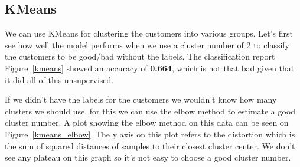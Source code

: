 \documentclass[runningheads]{llncs}
\begin{document}
\subsection{KMeans}
We can use KMeans for clustering the customers into various groups. Let's first see how well the model performs when we use a cluster number of 2 to classify the customers to be good/bad without the labels. The classification report Figure~\ref{kmeans} showed an accuracy of \textbf{0.664}, which is not that bad given that it did all of this unsupervised.

If we didn't have the labels for the customers we wouldn't know how many clusters we should use, for this we can use the elbow method to estimate a good cluster number. A plot showing the elbow method on this data can be seen on Figure~\ref{kmeans_elbow}. The y axis on this plot refers to the distortion which is the sum of squared distances of samples to their closest cluster center.
We don't see any plateau on this graph so it's not easy to choose a good cluster number.
\end{document}
